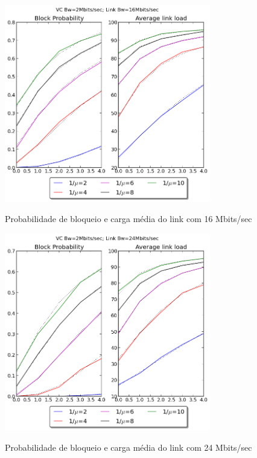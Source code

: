 \documentclass[pdftex,12pt,a4paper]{report}
\begin{document}
\begin{figure}[!htb]
\center
 \includegraphics[width=90mm,scale=1]{imagensGuia/graph1ex1.png}
 \label{fig:graph1ex1}
 \caption{Probabilidade de bloqueio e carga média do link com 16 Mbits/sec}
\end{figure}

\newpage
\begin{figure}[!htb]
\center
 \includegraphics[width=90mm,scale=1]{imagensGuia/graph2ex1.png}
 \label{fig:graph2ex1}
 \caption{Probabilidade de bloqueio e carga média do link com 24 Mbits/sec}
\end{figure}
\end{document}
